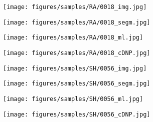 \documentclass[10pt,twocolumn,letterpaper]{article}
\begin{document}
\begin{figure*}[h!]
\centering
    \begin{subfigure}[b]{0.11\textwidth}
        \centering
        \texttt{[image: figures/samples/RA/0018\_img.jpg]}
    \end{subfigure}
    \begin{subfigure}[b]{0.11\textwidth}
        \centering
        \texttt{[image: figures/samples/RA/0018\_segm.jpg]}
    \end{subfigure}
    \begin{subfigure}[b]{0.11\textwidth}
        \centering
        \texttt{[image: figures/samples/RA/0018\_ml.jpg]}
    \end{subfigure}
    \begin{subfigure}[b]{0.11\textwidth}
        \centering
        \texttt{[image: figures/samples/RA/0018\_cDNP.jpg]}
    \end{subfigure}
    \hspace{10px}
    \begin{subfigure}[b]{0.11\textwidth}
        \centering
        \texttt{[image: figures/samples/SH/0056\_img.jpg]}
    \end{subfigure}
    \begin{subfigure}[b]{0.11\textwidth}
        \centering
        \texttt{[image: figures/samples/SH/0056\_segm.jpg]}
    \end{subfigure}
    \begin{subfigure}[b]{0.11\textwidth}
        \centering
        \texttt{[image: figures/samples/SH/0056\_ml.jpg]}
    \end{subfigure}
    \begin{subfigure}[b]{0.11\textwidth}
        \centering
        \texttt{[image: figures/samples/SH/0056\_cDNP.jpg]}
    \end{subfigure}


\end{figure*}
\end{document}
